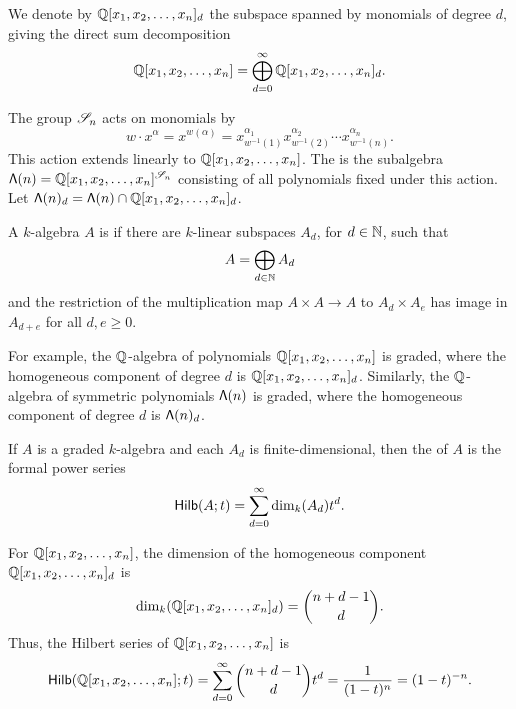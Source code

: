 We denote by \(\mathbb{Q}[x_1, x_2, \ldots, x_n]_d\) the subspace spanned by monomials of degree \(d\), giving the direct sum decomposition
\begin{equation}
    \mathbb{Q}[x_1, x_2, \ldots, x_n] = \bigoplus_{d=0}^\infty \mathbb{Q}[x_1, x_2, \ldots, x_n]_d.
\end{equation}

The group \(\mathscr{S}_{n}\) acts on monomials by
\begin{equation}
    w \cdot x^\alpha = x^{w(\alpha)} = x_{w^{-1}(1)}^{\alpha_1}x_{w^{-1}(2)}^{\alpha_2}\cdots x_{w^{-1}(n)}^{\alpha_n}.
\end{equation}
This action extends linearly to \(\mathbb{Q}[x_1, x_2, \ldots, x_n]\).
The  is the subalgebra \(\operatorname{\mathsf{\Lambda}}(n) = \mathbb{Q}[x_1, x_2, \ldots, x_n]^{\mathscr{S}_{n}}\) consisting of all polynomials fixed under this action.
Let \(\operatorname{\mathsf{\Lambda}}(n)_d = \operatorname{\mathsf{\Lambda}}(n) \cap \mathbb{Q}[x_1, x_2, \ldots, x_n]_d\).

A \(k\)-algebra \(A\) is  if
there are \(k\)-linear subspaces \(A_d\), for \(d \in \mathbb{N}\),
such that
\begin{equation}
    A = \bigoplus_{d \in \mathbb{N}} A_d
\end{equation}
and the restriction of the multiplication map \(A \times A \to A\) to \(A_d \times A_e\) has image in \(A_{d+e}\) for all \(d, e \geq 0\).

For example, the \(\mathbb{Q}\)-algebra of polynomials \(\mathbb{Q}[x_1, x_2, \ldots, x_n]\) is graded, where the homogeneous component of degree \(d\) is \(\mathbb{Q}[x_1, x_2, \ldots, x_n]_d\).
Similarly, the \(\mathbb{Q}\)-algebra of symmetric polynomials \(\operatorname{\mathsf{\Lambda}}(n)\) is graded, where the homogeneous component of degree \(d\) is \(\operatorname{\mathsf{\Lambda}}(n)_d\).

If \(A\) is a graded \(k\)-algebra and each \(A_d\) is finite-dimensional,
then the  of \(A\) is the formal power series
\begin{equation}
    \operatorname{\mathsf{Hilb}}(A; t) = \sum_{d=0}^\infty \dim_k(A_d)t^d.
\end{equation}

For \(\mathbb{Q}[x_1, x_2, \ldots, x_n]\),
the dimension of the homogeneous component \(\mathbb{Q}[x_1, x_2, \ldots, x_n]_d\) is
\begin{equation}
    \dim_k(\mathbb{Q}[x_1, x_2, \ldots, x_n]_d) = \binom{n+d-1}{d}.
\end{equation}
Thus, the Hilbert series of \(\mathbb{Q}[x_1, x_2, \ldots, x_n]\) is
\begin{equation}
    \operatorname{\mathsf{Hilb}}(\mathbb{Q}[x_1, x_2, \ldots, x_n]; t) = \sum_{d=0}^\infty \binom{n+d-1}{d}t^d = \frac{1}{(1-t)^n} = (1-t)^{-n}.
\end{equation}


